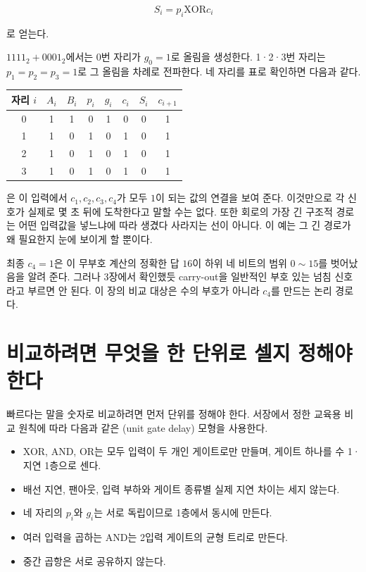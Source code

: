 \[
  S_i=p_i\mathbin{\mathrm{XOR}}c_i
\]

로 얻는다.

\(1111_2+0001_2\)에서는 0번 자리가 \(g_0=1\)로 올림을 생성한다. 1·2·3번 자리는 \(p_1=p_2=p_3=1\)로 그 올림을 차례로 전파한다. 네 자리를 표로 확인하면 다음과 같다.

\begin{center}
\small
\begin{tabular}{cccccccc}
\toprule
\sffamily\bfseries 자리 \(i\) &
\sffamily\bfseries \(A_i\) &
\sffamily\bfseries \(B_i\) &
\sffamily\bfseries \(p_i\) &
\sffamily\bfseries \(g_i\) &
\sffamily\bfseries \(c_i\) &
\sffamily\bfseries \(S_i\) &
\sffamily\bfseries \(c_{i+1}\) \\
\midrule
0 & 1 & 1 & 0 & 1 & 0 & 0 & 1 \\
1 & 1 & 0 & 1 & 0 & 1 & 0 & 1 \\
2 & 1 & 0 & 1 & 0 & 1 & 0 & 1 \\
3 & 1 & 0 & 1 & 0 & 1 & 0 & 1 \\
\bottomrule
\end{tabular}
\end{center}



은 이 입력에서 \(c_1,c_2,c_3,c_4\)가 모두 \(1\)이 되는 값의 연결을 보여 준다. 이것만으로 각 신호가 실제로 몇 초 뒤에 도착한다고 말할 수는 없다. 또한 회로의 가장 긴 구조적 경로는 어떤 입력값을 넣느냐에 따라 생겼다 사라지는 선이 아니다. 이 예는 그 긴 경로가 왜 필요한지 눈에 보이게 할 뿐이다.

최종 \(c_4=1\)은 이 무부호 계산의 정확한 답 \(16\)이 하위 네 비트의 범위 \(0\sim15\)를 벗어났음을 알려 준다. 그러나 3장에서 확인했듯 carry-out을 일반적인 부호 있는 넘침 신호라고 부르면 안 된다. 이 장의 비교 대상은 수의 부호가 아니라 \(c_4\)를 만드는 논리 경로다.

\section{비교하려면 무엇을 한 단위로 셀지 정해야 한다}

빠르다는 말을 숫자로 비교하려면 먼저 단위를 정해야 한다. 서장에서 정한 교육용 비교 원칙에 따라 다음과 같은 (unit gate delay) 모형을 사용한다.

\begin{itemize}
  \item XOR, AND, OR는 모두 입력이 두 개인 게이트로만 만들며, 게이트 하나를 수 1·지연 1층으로 센다.
  \item 배선 지연, 팬아웃, 입력 부하와 게이트 종류별 실제 지연 차이는 세지 않는다.
  \item 네 자리의 \(p_i\)와 \(g_i\)는 서로 독립이므로 1층에서 동시에 만든다.
  \item 여러 입력을 곱하는 AND는 2입력 게이트의 균형 트리로 만든다.
  \item 중간 곱항은 서로 공유하지 않는다.
\end{itemize}

